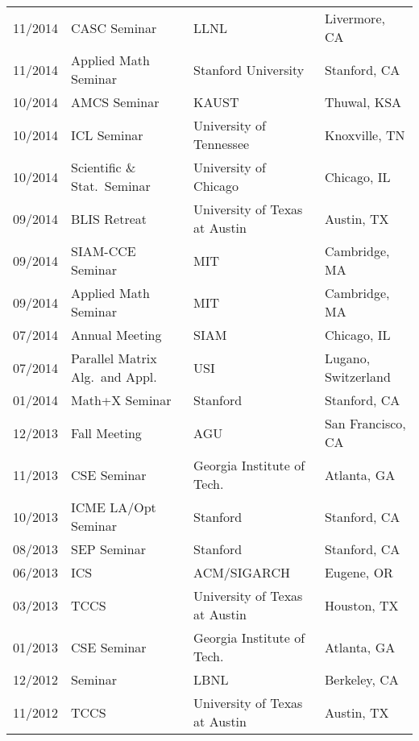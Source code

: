 \documentclass[letterpaper]{article}
\begin{document}
\begin{tabular}{rlll}
11/2014 & CASC Seminar                    & LLNL                          & Livermore, CA \\
11/2014 & Applied Math Seminar            & Stanford University           & Stanford, CA \\
10/2014 & AMCS Seminar                    & KAUST                         & Thuwal, KSA \\
10/2014 & ICL Seminar                     & University of Tennessee       & Knoxville, TN \\
10/2014 & Scientific \& Stat.\ Seminar    & University of Chicago         & Chicago, IL \\
09/2014 & BLIS Retreat                    & University of Texas at Austin & Austin, TX \\
09/2014 & SIAM-CCE Seminar                & MIT                           & Cambridge, MA \\
09/2014 & Applied Math Seminar            & MIT                           & Cambridge, MA \\
07/2014 & Annual Meeting                  & SIAM                          & Chicago, IL \\
07/2014 & Parallel Matrix Alg.\ and Appl. & USI                           & Lugano, Switzerland \\
01/2014 & Math+X Seminar                  & Stanford                      & Stanford, CA \\
12/2013 & Fall Meeting                    & AGU                           & San Francisco, CA \\
11/2013 & CSE Seminar                     & Georgia Institute of Tech.\   & Atlanta, GA \\
10/2013 & ICME LA/Opt Seminar             & Stanford                      & Stanford, CA \\
08/2013 & SEP Seminar                     & Stanford                      & Stanford, CA \\
06/2013 & ICS                             & ACM/SIGARCH                   & Eugene, OR \\
03/2013 & TCCS                            & University of Texas at Austin & Houston, TX \\
01/2013 & CSE Seminar                     & Georgia Institute of Tech.\   &  Atlanta, GA \\
12/2012 & Seminar                         & LBNL                          &  Berkeley, CA \\
11/2012 & TCCS                            & University of Texas at Austin & Austin, TX \\

\end{tabular}
\end{document}
